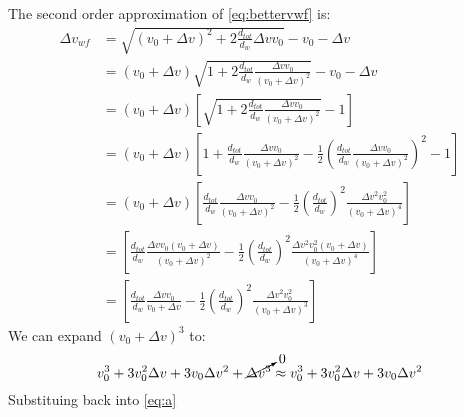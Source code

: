 \documentclass[12pt,letterpaper]{letter}
\newcommand{\dv}{\Delta v}
\begin{document}
The second order approximation of \eqref{eq:bettervwf} is:
\begin{align}
   \dv_{wf} &= \sqrt{\left( v_0 +\dv\right)^2+2\frac{d_{tot}}{d_w} \dv v_0 }-v_0 -\dv \\
   &= \left( v_0 +\dv\right)\sqrt{1+2\frac{d_{tot}}{d_w} \frac{\dv v_0}{\left( v_0 +\dv\right)^2} }-v_0 -\dv\\
   &= \left( v_0 +\dv\right)\left[ \sqrt{1+2\frac{d_{tot}}{d_w} \frac{\dv v_0}{\left( v_0 +\dv\right)^2} }-1 \right]\\
   &= \left( v_0 + \dv \right) \left[ 1+\frac{d_{tot}}{d_w}\frac{\dv v_0}{(v_0 +\dv)^2} -\frac{1}{2}\left( \frac{d_{tot}}{d_w}\frac{\dv v_0}{(v_0 + \dv)^2} \right)^2 -1 \right]\\
   &= \left( v_0 + \dv \right) \left[ \frac{d_{tot}}{d_w}\frac{\dv v_0}{(v_0 +\dv)^2} -\frac{1}{2}\left( \frac{d_{tot}}{d_w}\right)^2\frac{\dv^2 v_0^2}{(v_0 + \dv)^4} \right]\\
   &= \left[ \frac{d_{tot}}{d_w}\frac{\dv v_0\left( v_0 + \dv \right) }{(v_0 +\dv)^2} -\frac{1}{2}\left( \frac{d_{tot}}{d_w}\right)^2\frac{\dv^2 v_0^2\left( v_0 + \dv \right) }{(v_0 + \dv)^4} \right]\\
   &= \left[ \frac{d_{tot}}{d_w}\frac{\dv v_0 }{v_0 +\dv} -\frac{1}{2}\left( \frac{d_{tot}}{d_w}\right)^2\frac{\dv^2 v_0^2\ }{(v_0 + \dv)^3} \right]
   \label{eq:a}
\end{align}
We can expand $(v_0 + \dv)^3$ to:
\begin{equation}
   v_0^3+3v_0^2 \dv +3v_0\dv^2+\cancelto{0}{\dv^3} \approx v_0^3+3v_0^2 \dv +3v_0\dv^2
\end{equation}
Substituing back into \eqref{eq:a}
\end{document}
